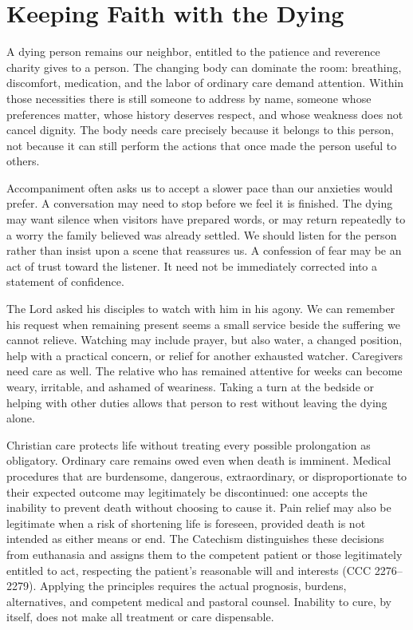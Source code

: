 \section{Keeping Faith with the Dying}

A dying person remains our neighbor, entitled to the patience and reverence charity gives to a person. The changing body can dominate the room: breathing, discomfort, medication, and the labor of ordinary care demand attention. Within those necessities there is still someone to address by name, someone whose preferences matter, whose history deserves respect, and whose weakness does not cancel dignity. The body needs care precisely because it belongs to this person, not because it can still perform the actions that once made the person useful to others.

Accompaniment often asks us to accept a slower pace than our anxieties would prefer. A conversation may need to stop before we feel it is finished. The dying may want silence when visitors have prepared words, or may return repeatedly to a worry the family believed was already settled. We should listen for the person rather than insist upon a scene that reassures us. A confession of fear may be an act of trust toward the listener. It need not be immediately corrected into a statement of confidence.

The Lord asked his disciples to watch with him in his agony. We can remember his request when remaining present seems a small service beside the suffering we cannot relieve. Watching may include prayer, but also water, a changed position, help with a practical concern, or relief for another exhausted watcher. Caregivers need care as well. The relative who has remained attentive for weeks can become weary, irritable, and ashamed of weariness. Taking a turn at the bedside or helping with other duties allows that person to rest without leaving the dying alone.

Christian care protects life without treating every possible prolongation as obligatory. Ordinary care remains owed even when death is imminent. Medical procedures that are burdensome, dangerous, extraordinary, or disproportionate to their expected outcome may legitimately be discontinued: one accepts the inability to prevent death without choosing to cause it. Pain relief may also be legitimate when a risk of shortening life is foreseen, provided death is not intended as either means or end. The Catechism distinguishes these decisions from euthanasia and assigns them to the competent patient or those legitimately entitled to act, respecting the patient's reasonable will and interests (CCC 2276--2279). Applying the principles requires the actual prognosis, burdens, alternatives, and competent medical and pastoral counsel. Inability to cure, by itself, does not make all treatment or care dispensable.

